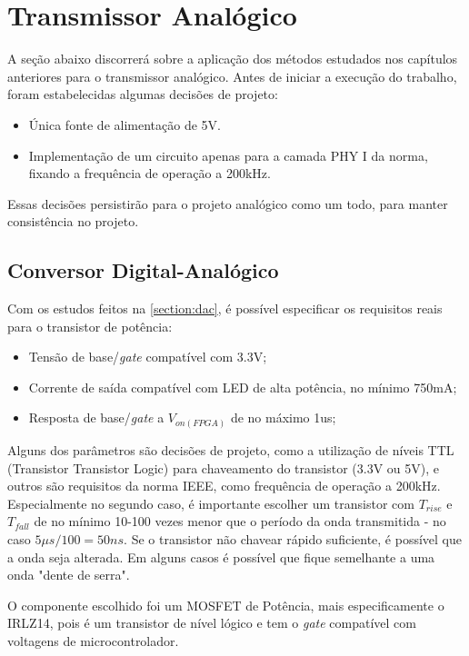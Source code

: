 	\section{Transmissor Analógico}
	A seção abaixo discorrerá sobre a aplicação dos métodos estudados nos capítulos anteriores para o transmissor analógico.
	Antes de iniciar a execução do trabalho, foram estabelecidas algumas decisões de projeto:
	
	\begin{itemize}
		\item Única fonte de alimentação de 5V.
		\item Implementação de um circuito apenas para a camada PHY I da norma, fixando a frequência de operação a 200kHz.
	\end{itemize}
	
	Essas decisões persistirão para o projeto analógico como um todo, para manter consistência no projeto.
	
	\subsection{Conversor Digital-Analógico}
	Com os estudos feitos na \autoref{section:dac}, é possível especificar os requisitos reais para o transistor de potência:

	\begin{itemize}
		\item Tensão de base/\textit{gate} compatível com 3.3V;
		\item Corrente de saída compatível com LED de alta potência, no mínimo 750mA;
		\item Resposta de base/\textit{gate} a $V_{on(FPGA)}$ de no máximo 1us;
	\end{itemize}
	
	Alguns dos parâmetros são decisões de projeto, como a utilização de níveis TTL (Transistor Transistor Logic) para chaveamento do transistor (3.3V ou 5V), e outros são requisitos da norma IEEE, como frequência de operação a 200kHz. Especialmente no segundo caso, é importante escolher um transistor com $T_{rise}$ e $T_{fall}$ de no mínimo 10-100 vezes menor que o período da onda transmitida - no caso $5\mu$$s/100 = 50ns$. Se o transistor não chavear rápido suficiente, é possível que a onda seja alterada. Em alguns casos é possível que fique semelhante a uma onda "dente de serra".
	
	O componente escolhido foi um MOSFET de Potência, mais especificamente o IRLZ14, pois é um transistor de nível lógico e tem o \textit{gate} compatível com voltagens de microcontrolador. 

